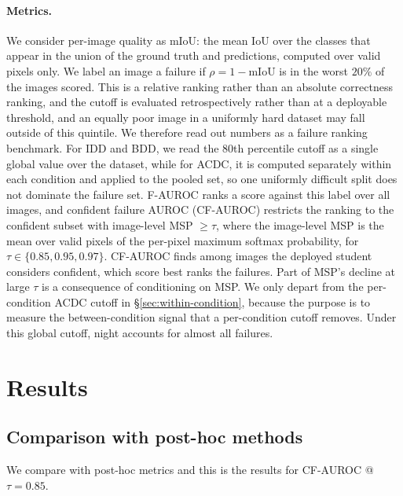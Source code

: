 \documentclass{article}
\begin{document}
\paragraph{Metrics.}
We consider per-image quality as mIoU: the mean IoU over the classes that appear in the union of the ground truth and predictions, computed over valid pixels only. We label an image a failure if $\rho = 1 - \mathrm{mIoU}$ is in the worst $20\%$ of the images scored. This is a relative ranking rather than an absolute correctness ranking, and the cutoff is evaluated retrospectively rather than at a deployable threshold, and an equally poor image in a uniformly hard dataset may fall outside of this quintile. We therefore read out numbers as a failure ranking benchmark. For IDD and BDD, we read the $80$th percentile cutoff as a single global value over the dataset, while for ACDC, it is computed separately within each condition and applied to the pooled set, so one uniformly difficult split does not dominate the failure set. F-AUROC ranks a score against this label over all images, and confident failure AUROC (CF-AUROC) restricts the ranking to the confident subset with image-level MSP $\geq \tau$, where the image-level MSP is the mean over valid pixels of the per-pixel maximum softmax probability, for $\tau \in \{0.85, 0.95, 0.97\}$. CF-AUROC finds among images the deployed student considers confident, which score best ranks the failures. Part of MSP's decline at large $\tau$ is a consequence of conditioning on MSP. We only depart from the per-condition ACDC cutoff in \S\ref{sec:within-condition}, because the purpose is to measure the between-condition signal that a per-condition cutoff removes. Under this global cutoff, night accounts for almost all failures.


\section{Results}

\subsection{Comparison with post-hoc methods}
\label{sec:teacher-vs-gt}

We compare with post-hoc metrics and this is the results for CF-AUROC @ $\tau = 0.85$.
\end{document}

